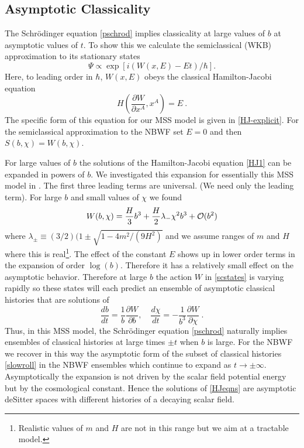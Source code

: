 \documentclass[prd,floats,superscriptaddress,eqsecnum,floatfix,nofootinbib,12pt]{revtex4}
\def\be{\begin{equation}}
\def\ee{\end{equation}}
\begin{document}
{{{{\subsection{Asymptotic Classicality} 
\label{asympclass}
The Schr\"odinger equation \eqref{pschrod} implies classicality at large values of $b$ at asymptotic values of $t$. To show this we calculate the semiclassical (WKB) approximation to its stationary states
\be
\Psi \propto \exp{[i(W(x,E) -Et)/\hbar] } .
\label{scstates}
\ee
Here,  to leading order in $\hbar$, $W(x,E)$ obeys the classical Hamilton-Jacobi equation
\be
\label{HJ1}
H\left(\frac{\partial W}{\partial x^A} ,x^A\right)= E\ .
\ee
The specific form of this equation for our MSS model is given in \eqref{HJ-explicit}. For the semiclassical approximation to the NBWF set  $E=0$ and then $S(b,\chi)=W(b,\chi)$.

For large values of $b$ the solutions of the Hamilton-Jacobi equation \eqref{HJ1} can be expanded in powers of $b$. We investigated this expansion \cite{Starobinsky83} for essentially this MSS model in \cite{HH12b,HHH14}. The first three leading terms are universal. (We need only the leading term). For large $b$ and small values of $\chi$ we found
\be
\label{asympc}
W(b,\chi) = \frac{H}{3} b^3 + \frac{H}{2}\lambda_{-} \chi^2 b^3 +  {\cal O}(b^2)
\ee
where $\lambda_{\pm} \equiv (3/2)(1\pm\sqrt{1-4m^2/(9H^2)}$ and we assume ranges of $m$ and $H$ where this is real\footnote{Realistic values of $m$ and $H$ are not in this range but we aim at a tractable model\footnotemark[1].}. The effect of the constant $E$ shows up in lower order terms in the expansion of order $\log(b)$. Therefore it has a relatively small effect on the asymptotic behavior. 
Therefore at large $b$ the action $W$ in \eqref{scstates} is varying rapidly so these states will each predict an ensemble of asymptotic classical histories that are solutions of \cite{HH12b,HHH14}
\be 
\frac{db}{dt} = \frac{1}{b} \frac{\partial W}{\partial b},   \quad \frac{d\chi}{dt}=-\frac{1}{b^3} \frac{\partial W}{\partial\chi} \ .
\label{HJeqns}
\ee
Thus, in this MSS model, the Schr\"odinger equation \eqref{pschrod} naturally implies ensembles of classical histories at large times $\pm t$ when $b$ is large. For the NBWF we recover in this way the asymptotic form of the subset of classical histories \eqref{slowroll} in the NBWF ensembles which continue to expand as $t \rightarrow \pm \infty$. Asymptotically the expansion is not driven by the scalar field potential energy but by the cosmological constant. Hence the solutions of \eqref{HJeqns} are asymptotic deSitter spaces with different histories of a decaying scalar field. 

}}}}
\end{document}
